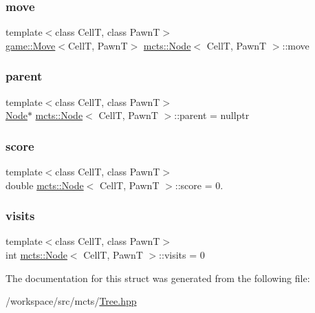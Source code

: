 \mbox{\label{structmcts_1_1_node_a485be08ab0693648e76d350b7c330e04}} 
\subsubsection{\texorpdfstring{move}{move}}
{\footnotesize\ttfamily template$<$class CellT, class PawnT$>$ \\
\hyperlink{structgame_1_1_move}{game\+::\+Move}$<$CellT, PawnT$>$ \hyperlink{structmcts_1_1_node}{mcts\+::\+Node}$<$ CellT, PawnT $>$\+::move}

\mbox{\label{structmcts_1_1_node_a45967e40ee370988a6d14f9fa697d9fd}} 
\subsubsection{\texorpdfstring{parent}{parent}}
{\footnotesize\ttfamily template$<$class CellT, class PawnT$>$ \\
\hyperlink{structmcts_1_1_node}{Node}$\ast$ \hyperlink{structmcts_1_1_node}{mcts\+::\+Node}$<$ CellT, PawnT $>$\+::parent = nullptr}

\mbox{\label{structmcts_1_1_node_a9a63000d8d53ea603b846eb0163b9660}} 
\subsubsection{\texorpdfstring{score}{score}}
{\footnotesize\ttfamily template$<$class CellT, class PawnT$>$ \\
double \hyperlink{structmcts_1_1_node}{mcts\+::\+Node}$<$ CellT, PawnT $>$\+::score = 0.}

\mbox{\label{structmcts_1_1_node_aca6c2aab11093323fb67357f25a31a3f}} 
\subsubsection{\texorpdfstring{visits}{visits}}
{\footnotesize\ttfamily template$<$class CellT, class PawnT$>$ \\
int \hyperlink{structmcts_1_1_node}{mcts\+::\+Node}$<$ CellT, PawnT $>$\+::visits = 0}



The documentation for this struct was generated from the following file\+:\begin{DoxyCompactItemize}
\item 
/workspace/src/mcts/\hyperlink{_tree_8hpp}{Tree.\+hpp}\end{DoxyCompactItemize}
